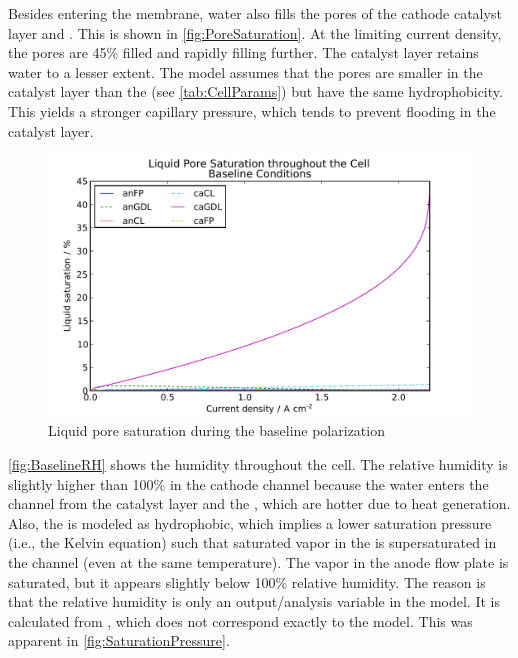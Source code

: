 Besides entering the membrane, water also fills the pores of the cathode catalyst layer and .  This is shown in \autoref{fig:PoreSaturation}.  At the limiting current density, the  pores are 45\% filled and rapidly filling further.  The catalyst layer retains water to a lesser extent.  The model assumes that the pores are smaller in the catalyst layer than the  (see \autoref{tab:CellParams}) but have the same hydrophobicity.  This yields a stronger capillary pressure, which tends to prevent flooding in the catalyst layer.

\begin{figure}[htbp]
  \includegraphics[width=\linewidth]{Results/Cell/Model/1/PoreSaturation}%
  \caption{Liquid pore saturation during the baseline polarization}%
  \label{fig:PoreSaturation}
\end{figure}

\autoref{fig:BaselineRH} shows the humidity throughout the cell.  The relative humidity is slightly higher than 100\% in the cathode channel because the water enters the channel from the catalyst layer and the , which are hotter due to heat generation.  Also, the   is modeled as hydrophobic, which implies a lower saturation pressure (i.e., the Kelvin equation) such that saturated vapor in the  is supersaturated in the channel (even at the same temperature).  The vapor in the anode flow plate is saturated, but it appears slightly below 100\% relative humidity.  The reason is that the relative humidity is only an output\slash{}analysis variable in the model.  It is calculated from , which does not correspond exactly to the model.  This was apparent in \autoref{fig:SaturationPressure}.

